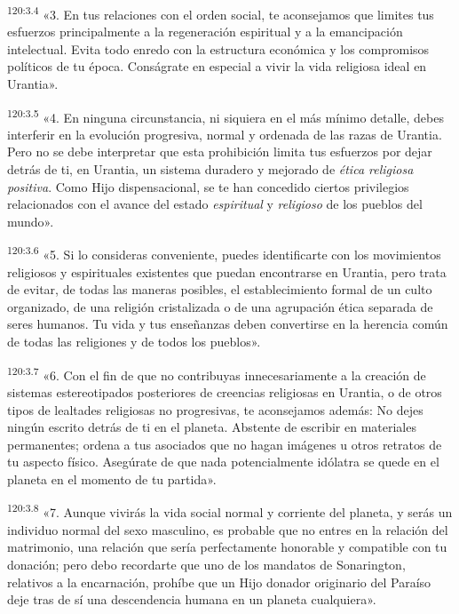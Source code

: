 \par 
\textsuperscript{120:3.4} «3. En tus relaciones con el orden social, te aconsejamos que limites tus esfuerzos principalmente a la regeneración espiritual y a la emancipación intelectual. Evita todo enredo con la estructura económica y los compromisos políticos de tu época. Conságrate en especial a vivir la vida religiosa ideal en Urantia».

\par 
\textsuperscript{120:3.5} «4. En ninguna circunstancia, ni siquiera en el más mínimo detalle, debes interferir en la evolución progresiva, normal y ordenada de las razas de Urantia. Pero no se debe interpretar que esta prohibición limita tus esfuerzos por dejar detrás de ti, en Urantia, un sistema duradero y mejorado de \textit{ética religiosa positiva}. Como Hijo dispensacional, se te han concedido ciertos privilegios relacionados con el avance del estado \textit{espiritual} y \textit{religioso} de los pueblos del mundo».

\par 
\textsuperscript{120:3.6} «5. Si lo consideras conveniente, puedes identificarte con los movimientos religiosos y espirituales existentes que puedan encontrarse en Urantia, pero trata de evitar, de todas las maneras posibles, el establecimiento formal de un culto organizado, de una religión cristalizada o de una agrupación ética separada de seres humanos. Tu vida y tus enseñanzas deben convertirse en la herencia común de todas las religiones y de todos los pueblos».

\par 
\textsuperscript{120:3.7} «6. Con el fin de que no contribuyas innecesariamente a la creación de sistemas estereotipados posteriores de creencias religiosas en Urantia, o de otros tipos de lealtades religiosas no progresivas, te aconsejamos además: No dejes ningún escrito detrás de ti en el planeta. Abstente de escribir en materiales permanentes; ordena a tus asociados que no hagan imágenes u otros retratos de tu aspecto físico. Asegúrate de que nada potencialmente idólatra se quede en el planeta en el momento de tu partida».

\par 
\textsuperscript{120:3.8} «7. Aunque vivirás la vida social normal y corriente del planeta, y serás un individuo normal del sexo masculino, es probable que no entres en la relación del matrimonio, una relación que sería perfectamente honorable y compatible con tu donación; pero debo recordarte que uno de los mandatos de Sonarington, relativos a la encarnación, prohíbe que un Hijo donador originario del Paraíso deje tras de sí una descendencia humana en un planeta cualquiera».

